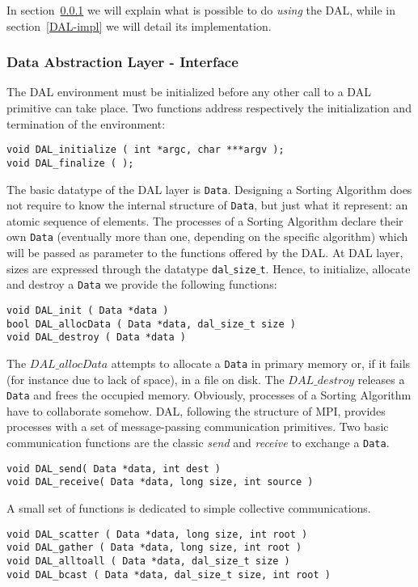 In section~\ref{DAL-int} we will explain what is possible to do \textit{using} the DAL, while in section~\ref{DAL-impl} we will detail its implementation. 

\subsubsection{Data Abstraction Layer - Interface}
\label{DAL-int}
The DAL environment must be initialized before any other call to a DAL primitive can take place. Two functions address respectively the initialization and termination of the environment:
\begin{lstlisting}
void DAL_initialize ( int *argc, char ***argv );
void DAL_finalize ( );
\end{lstlisting}
The basic datatype of the DAL layer is \texttt{Data}. Designing a Sorting Algorithm does not require to know the internal structure of \texttt{Data}, but just what it represent: an atomic sequence of elements. The processes of a Sorting Algorithm declare their own \texttt{Data} (eventually more than one, depending on the specific algorithm) which will be passed as parameter to the functions offered by the DAL. At DAL layer, sizes are expressed through the datatype \texttt{dal$\_$size$\_$t}. Hence, to initialize, allocate and destroy a \texttt{Data} we provide the following functions:
\begin{lstlisting}
void DAL_init ( Data *data )
bool DAL_allocData ( Data *data, dal_size_t size )
void DAL_destroy ( Data *data )
\end{lstlisting}
The $DAL\_allocData$ attempts to allocate a \texttt{Data} in primary memory or, if it fails (for instance due to lack of space), in a file on disk. The $DAL\_destroy$ releases a \texttt{Data} and frees the occupied memory. 
Obviously, processes of a Sorting Algorithm have to collaborate somehow. DAL, following the structure of MPI, provides processes with a set of message-passing communication primitives. Two basic communication functions are the classic \textit{send} and \textit{receive} to exchange a \texttt{Data}.
\begin{lstlisting}
void DAL_send( Data *data, int dest )
void DAL_receive( Data *data, long size, int source )
\end{lstlisting}
A small set of functions is dedicated to simple collective communications.
\begin{lstlisting}
void DAL_scatter ( Data *data, long size, int root )
void DAL_gather ( Data *data, long size, int root )
void DAL_alltoall ( Data *data, dal_size_t size )
void DAL_bcast ( Data *data, dal_size_t size, int root )
\end{lstlisting}
